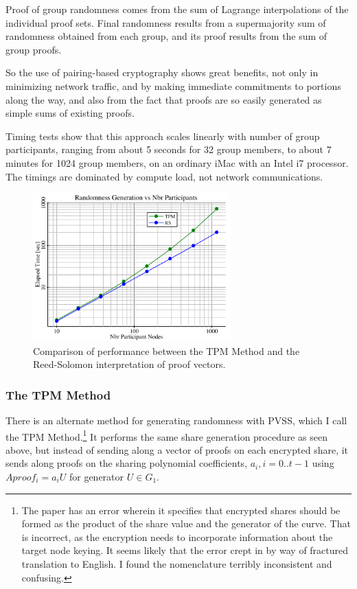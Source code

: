 \documentclass{yellowpaper}
\begin{document}
Proof of group randomness comes from the sum of Lagrange interpolations of the individual proof sets.
Final randomness results from a supermajority sum of randomness obtained from each group, and its proof results from the sum of group proofs. 

So the use of pairing-based cryptography shows great benefits, not only in minimizing network traffic, and by making immediate commitments to portions along the way, and also from the fact that proofs are so easily generated as simple sums of existing proofs.

Timing tests show that this approach scales linearly with number of group participants, ranging from about 5 seconds for 32 group members, to about 7 minutes for 1024 group members, on an ordinary iMac with an Intel i7 processor. The timings are dominated by compute load, not network communications.

\begin{figure}[h!]
  \centering
  \includegraphics[width=3in]{randtimings}
  \caption{ Comparison of performance between the TPM Method and the Reed-Solomon interpretation of proof vectors.}
  \label{fig:randtimings}
\end{figure}


\subsubsection{The TPM Method}
There is an alternate method for generating randomness with PVSS, which I call the TPM Method.\cite{tpm}\footnote{The paper has an error wherein it specifies that encrypted shares should be formed as the product of the share value and the generator of the curve. That is incorrect, as the encryption needs to incorporate information about the target node keying. It seems likely that the error crept in by way of fractured translation to English. I found the nomenclature terribly inconsistent and confusing.} It performs the same share generation procedure as seen above, but instead of sending along a vector of proofs on each encrypted share, it sends along proofs on the sharing polynomial coefficients, $a_i, i = 0..t-1$ using $Aproof_i = a_i U$ for generator $U \in G_1$.
\end{document}
